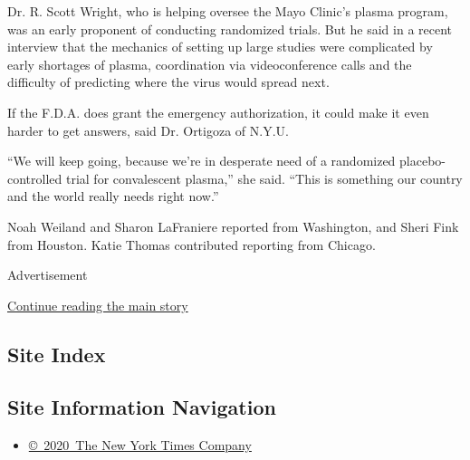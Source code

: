 Dr. R. Scott Wright, who is helping oversee the Mayo Clinic's plasma
program, was an early proponent of conducting randomized trials. But he
said in a recent interview that the mechanics of setting up large
studies were complicated by early shortages of plasma, coordination via
videoconference calls and the difficulty of predicting where the virus
would spread next.

If the F.D.A. does grant the emergency authorization, it could make it
even harder to get answers, said Dr. Ortigoza of N.Y.U.

``We will keep going, because we're in desperate need of a randomized
placebo-controlled trial for convalescent plasma,'' she said. ``This is
something our country and the world really needs right now.''

Noah Weiland and Sharon LaFraniere reported from Washington, and Sheri
Fink from Houston. Katie Thomas contributed reporting from Chicago.

Advertisement

\protect\hyperlink{after-bottom}{Continue reading the main story}

\hypertarget{site-index}{%
\subsection{Site Index}\label{site-index}}

\hypertarget{site-information-navigation}{%
\subsection{Site Information
Navigation}\label{site-information-navigation}}

\begin{itemize}
\tightlist
\item
  \href{https://help.nytimes3xbfgragh.onion/hc/en-us/articles/115014792127-Copyright-notice}{©~2020~The
  New York Times Company}
\end{itemize}

